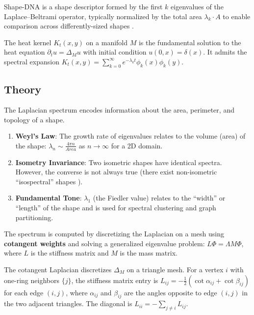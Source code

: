 \begin{definition}\label{def:shape_dna}
Shape-DNA is a shape descriptor formed by the first $k$ eigenvalues of the Laplace--Beltrami operator, typically normalized by the total area $\lambda_k \cdot A$ to enable comparison across differently-sized shapes \cite{reuter2006}.
\end{definition}

\begin{definition}\label{def:heat_kernel}
The heat kernel $K_t(x, y)$ on a manifold $M$ is the fundamental solution to the heat equation $\partial_t u = \Delta_M u$ with initial condition $u(0, x) = \delta(x)$. It admits the spectral expansion $K_t(x, y) = \sum_{k=0}^{\infty} e^{-\lambda_k t} \phi_k(x) \phi_k(y)$.
\end{definition}

\subsection{Theory}
The Laplacian spectrum encodes information about the area, perimeter, and topology of a shape.
\begin{enumerate}
  \item \textbf{Weyl's Law}: The growth rate of eigenvalues relates to the volume (area) of the shape: $\lambda_n \sim \frac{4\pi n}{Area}$ as $n \to \infty$ for a 2D domain.
  \item \textbf{Isometry Invariance}: Two isometric shapes have identical spectra. However, the converse is not always true (there exist non-isometric ``isospectral'' shapes \cite{kac1966}).
  \item \textbf{Fundamental Tone}: $\lambda_1$ (the Fiedler value) relates to the ``width'' or ``length'' of the shape and is used for spectral clustering and graph partitioning.
\end{enumerate}

The spectrum is computed by discretizing the Laplacian on a mesh using \textbf{cotangent weights} and solving a generalized eigenvalue problem: $L \Phi = \Lambda M \Phi$, where $L$ is the stiffness matrix and $M$ is the mass matrix.

\begin{definition}\label{def:cotangent_laplacian}
The cotangent Laplacian discretizes $\Delta_M$ on a triangle mesh. For a vertex $i$ with one-ring neighbors $\{j\}$, the stiffness matrix entry is $L_{ij} = -\frac{1}{2}(\cot \alpha_{ij} + \cot \beta_{ij})$ for each edge $(i,j)$, where $\alpha_{ij}$ and $\beta_{ij}$ are the angles opposite to edge $(i,j)$ in the two adjacent triangles. The diagonal is $L_{ii} = -\sum_{j \ne i} L_{ij}$.
\end{definition}

